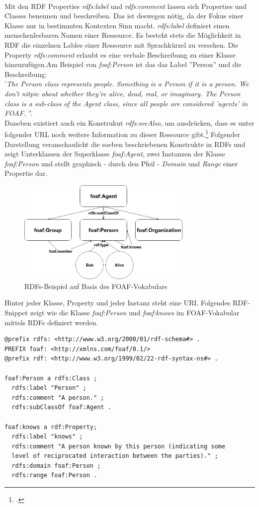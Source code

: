 \documentclass[12pt,a4paper]{article}
\begin{document}
\\
Mit den RDF Properties \textit{rdfs:label} und \textit{rdfs:comment} lassen sich Properties und Classes benennen und beschreiben. Das ist deswegen nötig, da der Fokus einer Klasse nur in bestimmten Kontexten Sinn macht. \textit{rdfs:label} definiert einen menschenlesbaren Namen einer Ressource. Es besteht stets die Möglichkeit in RDF die einzelnen Lables einer Ressource mit Sprachkürzel zu versehen. Die Property \textit{rdfs:comment} erlaubt es eine verbale Beschreibung zu einer Klasse hinzuzufügen.Am Beispiel von \textit{foaf:Person} ist das das Label ''Person'' und die Beschreibung:\\
'\textit{The Person class represents people. Something is a Person if it is a person. We don't nitpic about whether they're alive, dead, real, or imaginary. The Person class is a sub-class of the Agent class, since all people are considered 'agents' in FOAF. }''.\\
Daneben existiert auch ein Konstrukut \textit{rdfs:seeAlso}, um ausdrücken, dass es unter folgender URL noch weitere Information zu dieser Ressource gibt.\footcite{brickley2014rdf} Folgender Darstellung veranschaulicht die soeben beschriebenen Konstrukte in RDFs und zeigt Unterklassen der Superklasse \textit{foaf:Agent}, zwei Instanzen der Klasse \textit{foaf:Person} und stellt graphisch - durch den Pfeil - \textit{Domain} und \textit{Range} einer Propertie dar. 
\begin{figure}[H]
  \centering
	\includegraphics[width=0.75\textwidth]{img/rdfs.png}  
    \caption[RDFs-Beispiel auf Basis des FOAF-Vokabulars, eigene Darstellung.]{RDFs-Beispiel auf Basis des FOAF-Vokabulars}
  	\label{fig:web_stack}
\end{figure}
Hinter jeder Klasse, Property und  jeder Instanz steht eine URI. Folgendes RDF-Snippet zeigt wie die Klasse \textit{foaf:Person} und \textit{foaf:knows} im FOAF-Vokabular mittels RDFs definiert werden.
\begin{lstlisting}[]
@prefix rdfs: <http://www.w3.org/2000/01/rdf-schema#> .
PREFIX foaf: <http://xmlns.com/foaf/0.1/>
@prefix rdf: <http://www.w3.org/1999/02/22-rdf-syntax-ns#> .

foaf:Person a rdfs:Class ;
  rdfs:label "Person" ;
  rdfs:comment "A person." ;
  rdfs:subClassOf foaf:Agent .
  
foaf:knows a rdf:Property;
  rdfs:label "knows" ;
  rdfs:comment "A person known by this person (indicating some 
  level of reciprocated interaction between the parties)." ;
  rdfs:domain foaf:Person ;
  rdfs:range foaf:Person .
\end{lstlisting}
\end{document}
